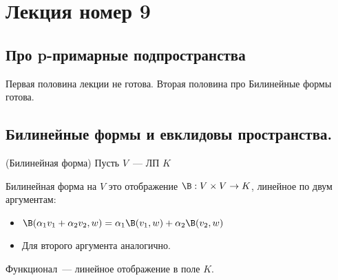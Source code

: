 \section{Лекция номер 9}

\subsection*{Про p-примарные подпространства}
Первая половина лекции не готова. Вторая половина про Билинейные формы готова.

\subsection*{Билинейные формы и евклидовы пространства.}

\begin{conj}(Билинейная форма)
Пусть $V$~--- ЛП $K$

Билинейная форма на $V$ это отображение $\B: V \times V \to K$, линейное по двум аргументам:
\begin{itemize}
    \item $\B(\alpha_1 v_1 + \alpha_2 v_2, w) = \alpha_1 \B(v_1, w) + \alpha_2\B(v_2, w)$
    \item Для второго аргумента аналогично.
\end{itemize}
\end{conj}

\notice Функционал~--- линейное отображение в поле $K$.

